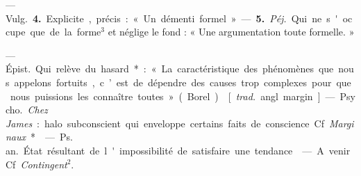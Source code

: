 \begin{itemize}[leftmargin=1cm, label=, itemsep=1pt]
— \si{Vulg.} {\bf 4.} Explicite, précis :« Un démenti formel ». — {\bf 5.}
{\it Péj.} Qui ne s'occupe que de la forme$^3$ et néglige le fond : « Une
argumentation toute formelle. »

 — \si{Épist.} Qui relève du hasard* : « La caractéristique des
phénomènes que nous appelons fortuits, c’est de dépendre des causes trop
complexes pour que nous puissions les connaître toutes » (Borel).

 [{\it trad.} angl. margin]. — \si{Psycho.}
{\it Chez James} : halo subconscient qui
enveloppe certains faits de conscience. Cf. {\it Marginaux}*.

 — \si{Ps. an.} État résultant
de l'impossibilité de satisfaire une tendance.

 — A venir. Cf. {\it Contingent}$^2$.

	\end{itemize}
